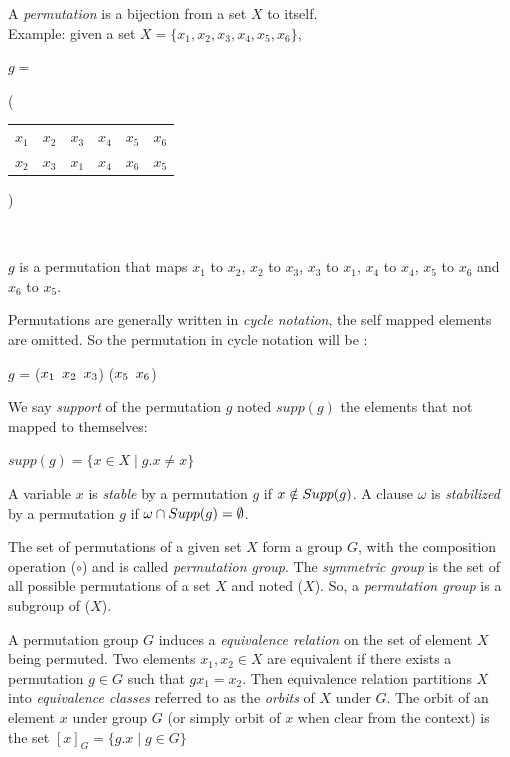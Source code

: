 A \emph{permutation} is a bijection from a set $X$ to itself.\\
Example: given a set $X = \{x_1, x_2, x_3, x_4, x_5, x_6\}$,
\begin{center}
$g = ${\Bigg( \begin{tabular}{cccccc}
		$x_1$ & $x_2$ & $x_3$ & $x_4$ & $x_5$ & $x_6$\\
		$x_2$ & $x_3$ & $x_1$ & $x_4$ & $x_6$ & $x_5$
	\end{tabular} \Bigg)}\\
\end{center}

$g$ is a permutation that maps $x_1$ to $x_2$, $x_2$ to $x_3$, $x_3$ to $x_1$, $x_4$ to $x_4$, $x_5$ to $x_6$ and $x_6$ to $x_5$.

Permutations are generally written in \emph{cycle notation}, the self mapped elements are omitted.
So the permutation in cycle notation will be : 
\begin{center}
	$g$ = ($x_1 \enskip x_2 \enskip x_3$) ($x_5 \enskip x_6$)
\end{center}

We say \emph{support} of the permutation $g$ noted $supp(g)$ the elements that not mapped to themselves:
\begin{center}
	$supp(g) = \{ x \in X \mid g.x \neq x\}$
\end{center}
A variable $x$ is \emph{stable} by a permutation $g$ 
if $x \notin Supp(g)$. A clause $\omega$ is \emph{stabilized} by a permutation $g$ if 
$\omega \cap Supp(g) = \emptyset$.


The set of permutations of a given set $X$ form a group $G$,
with the composition operation ($\circ$) and is called \emph{permutation group}.
The \emph{symmetric group} is the set of all possible permutations of a set $X$ and noted \Group($X$).
So, a \emph{permutation group} is a subgroup of \Group($X$). 


A permutation group $G$ induces a \emph{equivalence relation} on the set of element $X$ being
permuted. Two elements $x_1, x_2 \in X$ are equivalent if there exists a permutation $g \in G$ such that
$g x_1 = x_2$. Then equivalence relation partitions $X$ into \emph{equivalence classes} referred to
as the \emph{orbits} of $X$ under $G$. The orbit of an element $x$ under group $G$ (or simply orbit of $x$ when clear
from the context) is the set $[x]_G = \{g.x \mid g \in G\}$


